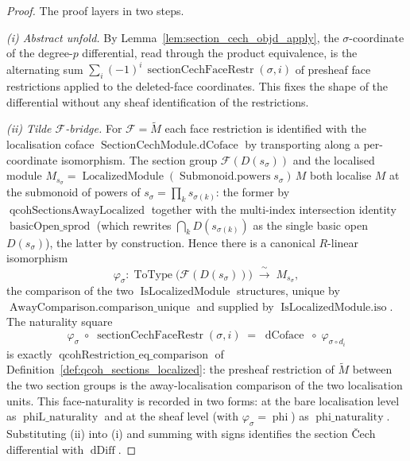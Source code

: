 \begin{proof}
  The proof layers in two steps.

  \emph{(i) Abstract unfold.} By Lemma~\ref{lem:section_cech_objd_apply}, the
  \(\sigma\)-coordinate of the degree-\(p\) differential, read through the product
  equivalence, is the alternating sum
  \(\sum_{i} (-1)^i\, \operatorname{sectionCechFaceRestr}(\sigma, i)\) of presheaf face
  restrictions applied to the deleted-face coordinates. This fixes the shape of the
  differential without any sheaf identification of the restrictions.

  \emph{(ii) Tilde \(\mathcal{F}\)-bridge.} For \(\mathcal{F} = \widetilde{M}\) each
  face restriction is identified with the localisation coface
  \(\operatorname{SectionCechModule.dCoface}\) by transporting along a per-coordinate
  isomorphism. The section group
  \(\mathcal{F}(D(s_\sigma))\) and the localised module
  \(M_{s_\sigma} = \operatorname{LocalizedModule}(\operatorname{Submonoid.powers}
  s_\sigma)\, M\) both localise \(M\) at the submonoid of powers of
  \(s_\sigma = \prod_k s_{\sigma(k)}\): the former by
  \(\operatorname{qcohSectionsAwayLocalized}\) together with the multi-index
  intersection identity \(\operatorname{basicOpen\_sprod}\) (which rewrites
  \(\bigcap_k D(s_{\sigma(k)})\) as the single basic open \(D(s_\sigma)\)), the latter
  by construction. Hence there is a canonical \(R\)-linear isomorphism
  \[
    \varphi_\sigma :
      \operatorname{ToType}\bigl(\mathcal{F}(D(s_\sigma))\bigr)
      \;\xrightarrow{\;\sim\;}\;
      M_{s_\sigma},
  \]
  the comparison of the two \(\operatorname{IsLocalizedModule}\) structures, unique by
  \(\operatorname{AwayComparison.comparison\_unique}\) and supplied by
  \(\operatorname{IsLocalizedModule.iso}\). The naturality square
  \[
    \varphi_\sigma \;\circ\; \operatorname{sectionCechFaceRestr}(\sigma, i)
      \;=\;
      \operatorname{dCoface} \;\circ\; \varphi_{\sigma \circ d_i}
  \]
  is exactly \(\operatorname{qcohRestriction\_eq\_comparison}\) of
  Definition~\ref{def:qcoh_sections_localized}: the presheaf restriction of
  \(\widetilde{M}\) between the two section groups is the away-localisation comparison
  of the two localisation units. This face-naturality is recorded in two forms: at the
  bare localisation level as \(\operatorname{phiL\_naturality}\) and at the sheaf level
  (with \(\varphi_\sigma = \operatorname{phi}\)) as \(\operatorname{phi\_naturality}\).
  Substituting (ii) into (i) and summing with signs
  identifies the section {\v C}ech differential with \(\operatorname{dDiff}\).


\end{proof}
